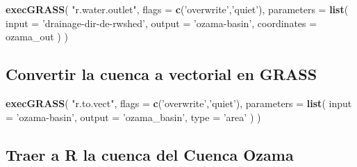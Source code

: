 \documentclass[11pt,]{article}
\newenvironment{Shaded}{\begin{snugshade}}{\end{snugshade}}
\newcommand{\KeywordTok}[1]{\textcolor[rgb]{0.13,0.29,0.53}{\textbf{#1}}}
\newcommand{\DataTypeTok}[1]{\textcolor[rgb]{0.13,0.29,0.53}{#1}}
\newcommand{\StringTok}[1]{\textcolor[rgb]{0.31,0.60,0.02}{#1}}
\newcommand{\NormalTok}[1]{#1}
\begin{document}
\begin{Shaded}
\begin{Highlighting}[]
\KeywordTok{execGRASS}\NormalTok{(}
  \StringTok{"r.water.outlet"}\NormalTok{,}
  \DataTypeTok{flags =} \KeywordTok{c}\NormalTok{(}\StringTok{'overwrite'}\NormalTok{,}\StringTok{'quiet'}\NormalTok{),}
  \DataTypeTok{parameters =} \KeywordTok{list}\NormalTok{(}
    \DataTypeTok{input =} \StringTok{'drainage-dir-de-rwshed'}\NormalTok{,}
    \DataTypeTok{output =} \StringTok{'ozama-basin'}\NormalTok{,}
    \DataTypeTok{coordinates =}\NormalTok{ ozama_out}
\NormalTok{  )}
\NormalTok{)}
\end{Highlighting}
\end{Shaded}

\subsection{Convertir la cuenca a vectorial en
GRASS}\label{convertir-la-cuenca-a-vectorial-en-grass}

\begin{Shaded}
\begin{Highlighting}[]
\KeywordTok{execGRASS}\NormalTok{(}
  \StringTok{"r.to.vect"}\NormalTok{,}
  \DataTypeTok{flags =} \KeywordTok{c}\NormalTok{(}\StringTok{'overwrite'}\NormalTok{,}\StringTok{'quiet'}\NormalTok{),}
  \DataTypeTok{parameters =} \KeywordTok{list}\NormalTok{(}
    \DataTypeTok{input =} \StringTok{'ozama-basin'}\NormalTok{,}
    \DataTypeTok{output =} \StringTok{'ozama_basin'}\NormalTok{,}
    \DataTypeTok{type =} \StringTok{'area'}
\NormalTok{  )}
\NormalTok{)}
\end{Highlighting}
\end{Shaded}

\subsection{Traer a R la cuenca del Cuenca
Ozama}\label{traer-a-r-la-cuenca-del-cuenca-ozama}
\end{document}
